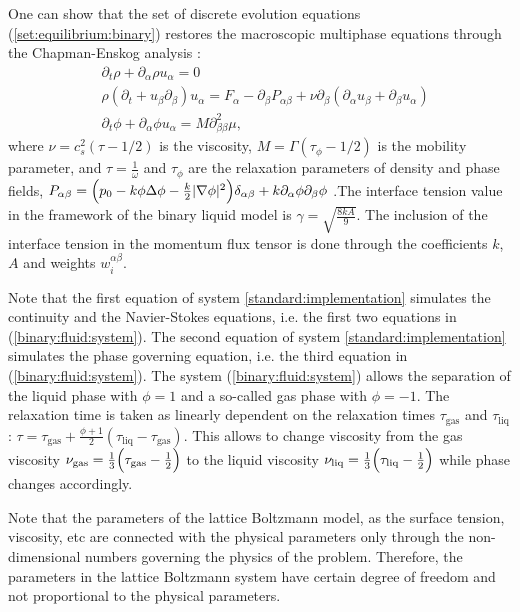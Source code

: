 \documentclass{article}
\begin{document}
One can show that the set of discrete evolution equations (\ref{set:equilibrium:binary}) restores the macroscopic
multiphase equations through the Chapman-Enskog analysis \cite{chapman}:
\begin{equation}
\begin{aligned}
&\partial_t \rho+ \partial_{\alpha} \rho u_{\alpha}=0\\
&\rho\left(\partial_t+u_{\beta}\partial_{\beta}\right) u_{\alpha}= F_{\alpha}
-\partial_{\beta}P_{\alpha \beta} +
\nu\partial_{\beta}\left(\partial_{\alpha}u_{\beta}+\partial_{\beta} u_{\alpha}\right)\\
&\partial_t \phi + \partial_{\alpha} \phi u_{\alpha}=M \partial^2_{\beta\beta} \mu,
\end{aligned}
\label{binary:fluid:system}
\end{equation}
where $\nu=c_s^2 (\tau-1/2)$ is the viscosity,
$M=\Gamma(\tau_{\phi}-1/2)$ is the mobility parameter, and $\tau=\frac{1}{\omega}$ and $\tau_{\phi}$ are the relaxation parameters of density and phase fields, 
$P_{\alpha\beta}=\Bigl(p_0-k\phi \Delta \phi -\frac{k}{2}|\nabla \phi|^2\Bigr)\delta_{\alpha\beta}
+ k \partial_{\alpha} \phi \partial_{\beta} \phi$  \cite{pooley-contact}.The interface tension value in the framework of the binary liquid model is $\gamma=\sqrt{\frac{8 k
A}{9}}$. The inclusion of the interface tension in the momentum flux tensor is done through the coefficients $k$, $A$ and weights $w_i^{\alpha\beta}$.

Note that the first equation of system \ref{standard:implementation} simulates the continuity and
the Navier-Stokes equations, i.e. the first two equations in (\ref{binary:fluid:system}). The second
equation of system \ref{standard:implementation} simulates the phase governing equation, i.e. the third
equation in (\ref{binary:fluid:system}). The system (\ref{binary:fluid:system}) allows the separation of the
liquid phase with $\phi=1$ and a so-called gas phase with $\phi=-1$. The relaxation time is taken as linearly dependent on the relaxation times $\tau_{\mathrm{gas}}$ and $\tau_{\mathrm{liq}}$:
$\tau=\tau_{\mathrm{gas}}+\frac{\phi+1}{2}(\tau_{\mathrm{liq}}-\tau_{\mathrm{gas}})$. This allows
to change viscosity from the gas viscosity $\nu_{\mathrm{gas}}=\frac{1}{3}\Bigl(\tau_{\mathrm{gas}}-\frac{1}{2}\Bigr)$ to the liquid viscosity
$\nu_{\mathrm{liq}}=\frac{1}{3}\Bigl(\tau_{\mathrm{liq}}-\frac{1}{2}\Bigr)$ while phase changes
accordingly.

Note that the parameters of the lattice Boltzmann model, as the surface tension, viscosity, etc are connected with the physical parameters only through the non-dimensional numbers governing the physics of the problem.  Therefore, the parameters in the lattice Boltzmann system have certain degree of freedom and not proportional to the physical parameters.
\end{document}
